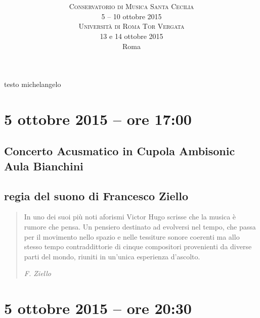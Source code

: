 \documentclass[8pt, twoside, a5paper]{extreport}
\title{
	\svolk{CONSERVATORIO DI MUSICA S. CECILIA} \\
	\fontsize{50}{50}
	\svolk{
		\emph{
			EMUFest 2015
			}
		}
	} %
\author{
	\textsc{Conservatorio di Musica Santa Cecilia} \\
	5 -- 10 ottobre 2015 \\
	\textsc{Università di Roma Tor Vergata} \\
	13 e 14 ottobre 2015 \\
	Roma
}
\date{}
\begin{document}
\pagestyle{empty}
\maketitle 

\clearpage

testo michelangelo

\clearpage


\section*{5 ottobre 2015 -- ore 17:00}

\subsection*{{\small Concerto Acusmatico in Cupola Ambisonic} \\
	\textsf{Aula Bianchini}}

{\fontsize{30}{30} }

\subsection*{\textsf{regia del suono di Francesco Ziello}}

\begin{quote}
{\svolk \small
In uno dei suoi più noti aforismi Victor Hugo scrisse che la musica è rumore che pensa.
Un pensiero destinato ad evolversi nel tempo, che passa per il movimento nello spazio e nelle tessiture sonore coerenti ma allo stesso tempo contraddittorie di cinque compositori provenienti da diverse parti del mondo,
riuniti in un’unica esperienza d’ascolto.}

\emph{F. Ziello}
\end{quote}


\begin{multicols}{2}




\end{multicols}

\clearpage

\section*{5 ottobre 2015 -- ore 20:30}
\end{document}
